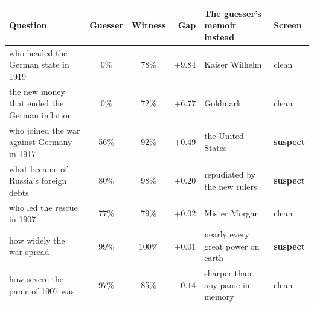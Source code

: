 \begin{tabular}{p{4.9cm}ccr p{2.9cm}l}
\toprule
Question & Guesser & Witness & Gap & The guesser's memoir instead & Screen \\
\midrule
who headed the German state in 1919 & 0\% & 78\% & $+9.84$ & Kaiser Wilhelm & clean \\
the new money that ended the German inflation & 0\% & 72\% & $+6.77$ & Goldmark & clean \\
who joined the war against Germany in 1917 & 56\% & 92\% & $+0.49$ & the United States & \textbf{suspect} \\
what became of Russia's foreign debts & 80\% & 98\% & $+0.20$ & repudiated by the new rulers & \textbf{suspect} \\
who led the rescue in 1907 & 77\% & 79\% & $+0.02$ & Mister Morgan & clean \\
how widely the war spread & 99\% & 100\% & $+0.01$ & nearly every great power on earth & \textbf{suspect} \\
how severe the panic of 1907 was & 97\% & 85\% & $-0.14$ & sharper than any panic in memory & clean \\
\bottomrule
\end{tabular}